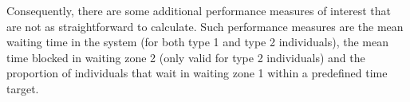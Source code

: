 Consequently, there are some additional performance measures of interest that
are not as straightforward to calculate.
Such performance measures are the mean waiting time in the system (for both 
type 1 and type 2 individuals), the mean time blocked in waiting zone 2 (only 
valid for type 2 individuals) and the proportion of individuals that wait in 
waiting zone 1 within a predefined time target.





